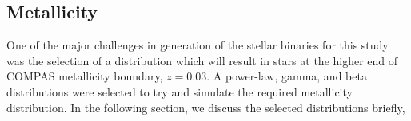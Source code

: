 \begin{center}
    \section*{Metallicity}
    \label{sec:metallicity}
\end{center}
One of the major challenges in generation of the stellar binaries for this study was the selection of a distribution which will result in stars at the higher end of COMPAS metallicity boundary, $z = 0.03$.
A power-law, gamma, and beta distributions were selected to try and simulate the required metallicity distribution.
In the following section, we discuss the selected distributions briefly,
\newpage\cleardoublepage
